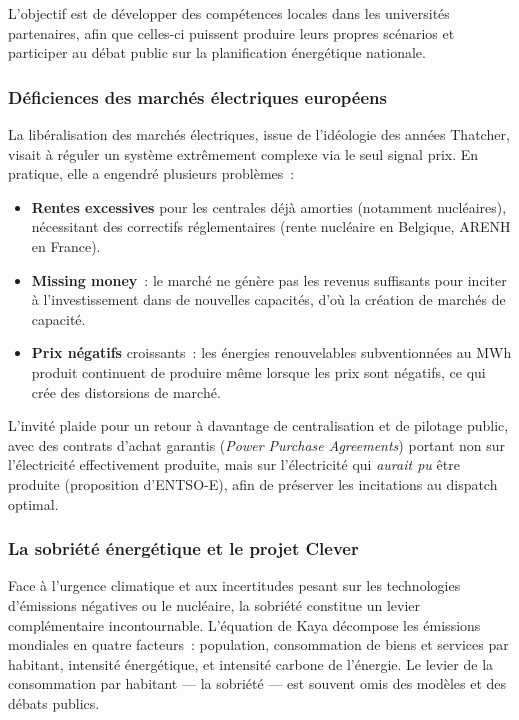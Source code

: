 L'objectif est de développer des compétences locales dans les universités partenaires, afin que celles-ci puissent produire leurs propres scénarios et participer au débat public sur la planification énergétique nationale.

\subsubsection{Déficiences des marchés électriques européens}

La libéralisation des marchés électriques, issue de l'idéologie des années Thatcher, visait à réguler un système extrêmement complexe via le seul signal prix. En pratique, elle a engendré plusieurs problèmes~:

\begin{itemize}
    \item \textbf{Rentes excessives} pour les centrales déjà amorties (notamment nucléaires), nécessitant des correctifs réglementaires (rente nucléaire en Belgique, ARENH en France).
    \item \textbf{Missing money}~: le marché ne génère pas les revenus suffisants pour inciter à l'investissement dans de nouvelles capacités, d'où la création de marchés de capacité.
    \item \textbf{Prix négatifs} croissants~: les énergies renouvelables subventionnées au MWh produit continuent de produire même lorsque les prix sont négatifs, ce qui crée des distorsions de marché.
\end{itemize}

L'invité plaide pour un retour à davantage de centralisation et de pilotage public, avec des contrats d'achat garantis (\textit{Power Purchase Agreements}) portant non sur l'électricité effectivement produite, mais sur l'électricité qui \textit{aurait pu} être produite (proposition d'ENTSO-E), afin de préserver les incitations au dispatch optimal.

\subsubsection{La sobriété énergétique et le projet Clever}

Face à l'urgence climatique et aux incertitudes pesant sur les technologies d'émissions négatives ou le nucléaire, la sobriété constitue un levier complémentaire incontournable. L'équation de Kaya décompose les émissions mondiales en quatre facteurs~: population, consommation de biens et services par habitant, intensité énergétique, et intensité carbone de l'énergie. Le levier de la consommation par habitant --- la sobriété --- est souvent omis des modèles et des débats publics.


